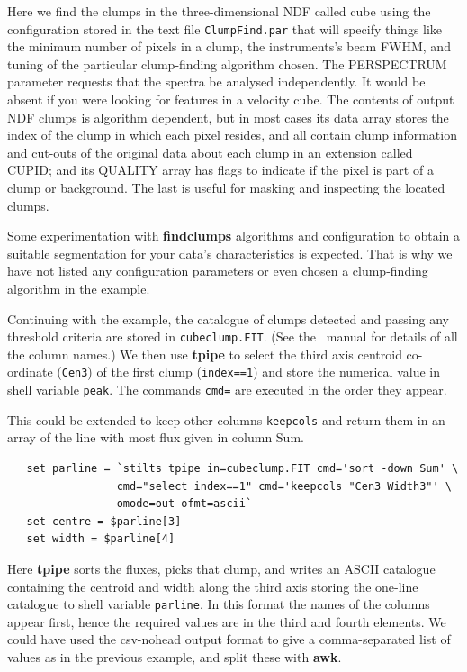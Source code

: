 \documentclass[twoside,11pt]{article}
\newcommand{\xref}[3]{#1}
\begin{document}
{Here we find the clumps in the three-dimensional NDF called cube using
the configuration stored in the text file {\tt ClumpFind.par} that
will specify things like the minimum number of pixels in a clump, the
instruments's beam FWHM, and tuning of the particular clump-finding
algorithm chosen.  The PERSPECTRUM parameter requests that the spectra
be analysed independently.  It would be absent if you were looking for
features in a velocity cube.  The contents of output NDF clumps is
algorithm dependent, but in most cases its data array stores the index
of the clump in which each pixel resides, and all contain clump
information and cut-outs of the original data about each clump in an
extension called CUPID; and its QUALITY array has flags to indicate if
the pixel is part of a clump or background.  The last is useful for
masking and inspecting the located clumps.

Some experimentation with {\bf findclumps} algorithms and
configuration to obtain a suitable segmentation for your data's
characteristics is expected.  That is why we have not listed any
configuration parameters or even chosen a clump-finding algorithm in
the example.

Continuing with the example, the catalogue of clumps detected and
passing any threshold criteria are stored in {\tt cubeclump.FIT}. (See
the \xref{\CUPID\ manual}{sun255}{FINDCLUMPS} for details of all the
column names.) We then use {\bf tpipe} to select the third axis
centroid co-ordinate ({\tt Cen3}) of the first clump ({\tt index==1})
and store the numerical value in shell variable {\tt peak}.  The
commands {\tt cmd=} are executed in the order they appear.

This could be extended to keep other columns {\tt keepcols} and return
them in an array of the line with most flux given in column Sum.

\begin{verbatim}
   set parline = `stilts tpipe in=cubeclump.FIT cmd='sort -down Sum' \
                 cmd="select index==1" cmd='keepcols "Cen3 Width3"' \
                 omode=out ofmt=ascii`
   set centre = $parline[3]
   set width = $parline[4]
\end{verbatim}

Here {\bf tpipe} sorts the fluxes, picks that clump, and writes an
ASCII catalogue containing the centroid and width along the third axis
storing the one-line catalogue to shell variable {\tt parline}.  In
this format the names of the columns appear first, hence the required
values are in the third and fourth elements.  We could have used the
csv-nohead output format to give a comma-separated list of values as
in the previous example, and \xref{split these with {\bf
awk}}{sc4}{sc4_se_string_split}.

}
\end{document}
